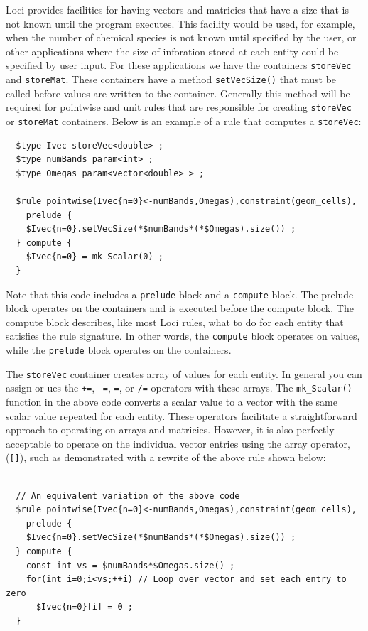 \documentclass[10pt,epsf,letterpaper,twoside]{book}
\begin{document}
Loci provides facilities for having vectors and matricies that have a
size that is not known until the program executes.  This facility
would be used, for example, when the number of chemical species is not
known until specified by the user, or other applications where the
size of inforation stored at each entity could be specified by user
input.  For these applications we have the containers {\tt storeVec}
and {\tt storeMat}.  These containers have a method {\tt setVecSize()}
that must be called before values are written to the container.
Generally this method will be required for pointwise and unit rules
that are responsible for creating {\tt storeVec} or {\tt storeMat}
containers.  Below is an example of a rule that computes a {\tt storeVec}:
\begin{verbatim}
  $type Ivec storeVec<double> ;
  $type numBands param<int> ;
  $type Omegas param<vector<double> > ;

  $rule pointwise(Ivec{n=0}<-numBands,Omegas),constraint(geom_cells),
    prelude {
    $Ivec{n=0}.setVecSize(*$numBands*(*$Omegas).size()) ;
  } compute {
    $Ivec{n=0} = mk_Scalar(0) ;
  }
\end{verbatim}
Note that this code includes a {\tt prelude} block and a {\tt compute}
block.  The prelude block operates on the containers and is executed
before the compute block.  The compute block describes, like most Loci
rules, what to do for each entity that satisfies the rule signature.
In other words, the {\tt compute} block operates on values, while the
{\tt prelude} block operates on the containers.

The {\tt storeVec} container creates array of values for each entity.
In general you can assign or ues the {\tt +=}, {\tt-=}, {\tt \*=}, or
{\tt /=} operators with these arrays.  The {\tt mk\_Scalar()} function in
the above code converts a scalar value to a vector with the same
scalar value repeated for each entity.  These operators facilitate a
straightforward approach to operating on arrays and matricies.
However, it is also perfectly acceptable to operate on the individual
vector entries using the array operator, ({\tt []}), such as
demonstrated with a rewrite of the above rule shown below:
\begin{verbatim}

  // An equivalent variation of the above code
  $rule pointwise(Ivec{n=0}<-numBands,Omegas),constraint(geom_cells),
    prelude {
    $Ivec{n=0}.setVecSize(*$numBands*(*$Omegas).size()) ;
  } compute {
    const int vs = $numBands*$Omegas.size() ;
    for(int i=0;i<vs;++i) // Loop over vector and set each entry to zero
      $Ivec{n=0}[i] = 0 ;
  }
\end{verbatim}
\end{document}
